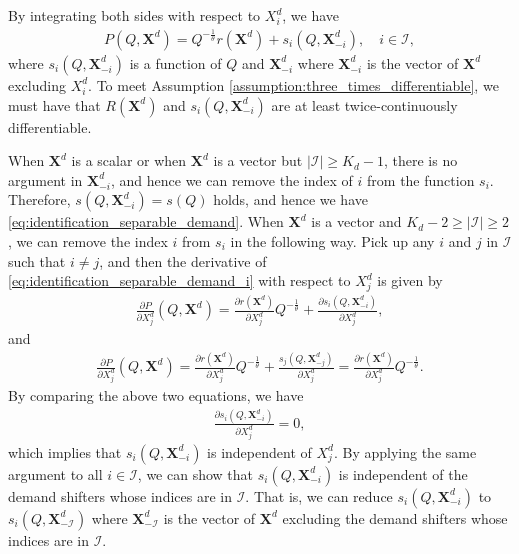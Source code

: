 \documentclass[11pt, a4paper]{article}
\begin{document}
By integrating both sides with respect to $X^{d}_i$, we have
\begin{align}
    P(Q, \bm{X}^{d}) = Q^{-\frac{1}{\theta}}r(\bm{X}^{d}) + s_i(Q, \bm{X}^{d}_{-i}), \quad i \in \mathcal{I}, \label{eq:identification_separable_demand_i}
\end{align}
where $s_i(Q, \bm{X}^{d}_{-i})$ is a function of $Q$ and $\bm{X}^{d}_{-i}$ where $\bm{X}^{d}_{-i}$ is the vector of $\bm{X}^{d}$ excluding $X^{d}_i$.
To meet Assumption \ref{assumption:three_times_differentiable}, we must have that $R(\bm{X}^{d})$ and $s_i(Q, \bm{X}^{d}_{-i})$ are at least twice-continuously differentiable.

When $\bm{X}^{d}$ is a scalar or when $\bm{X}^{d}$ is a vector but $|\mathcal{I}| \ge K_d-1$, there is no argument in $\bm{X}^{d}_{-i}$, and hence we can remove the index of $i$ from the function $s_i$.
Therefore, $s(Q, \bm{X}^{d}_{-i}) = s(Q)$ holds, and hence we have \eqref{eq:identification_separable_demand}.
When $\bm{X}^{d}$ is a vector and $K_d -2 \ge|\mathcal{I}|\ge 2$, we can remove the index $i$ from $s_i$ in the following way.
Pick up any $i$ and $j$ in $\mathcal{I}$ such that $i \ne j$, and then the derivative of \eqref{eq:identification_separable_demand_i} with respect to $X^{d}_j$ is given by
\begin{align}
    \frac{\partial P}{\partial X^{d}_j}(Q, \bm{X}^{d}) = \frac{\partial r(\bm{X}^{d})}{\partial X^{d}_j} Q^{-\frac{1}{\theta}} + \frac{\partial s_i(Q, \bm{X}^{d}_{-i})}{\partial X^{d}_j},
\end{align}
and
\begin{align}
    \frac{\partial P}{\partial X^{d}_j}(Q, \bm{X}^{d}) = \frac{\partial r(\bm{X}^{d})}{\partial X^{d}_j} Q^{-\frac{1}{\theta}} + \frac{s_j(Q, \bm{X}^{d}_{-j})}{\partial X^{d}_j} = \frac{\partial r(\bm{X}^{d})}{\partial X^{d}_j} Q^{-\frac{1}{\theta}}.
\end{align}
By comparing the above two equations, we have
\begin{align}
    \frac{\partial s_i(Q, \bm{X}^{d}_{-i})}{\partial X^{d}_j} = 0,
\end{align} 
which implies that $s_i(Q, \bm{X}^{d}_{-i})$ is independent of $X^{d}_j$.
By applying the same argument to all $i \in \mathcal{I}$, we can show that $s_i(Q, \bm{X}^{d}_{-i})$ is independent of the demand shifters whose indices are in $\mathcal{I}$.
That is, we can reduce $s_i(Q, \bm{X}^{d}_{-i})$ to $s_i(Q, \bm{X}^{d}_{-\mathcal{I}})$ where $\bm{X}^{d}_{-\mathcal{I}}$ is the vector of $\bm{X}^{d}$ excluding the demand shifters whose indices are in $\mathcal{I}$.
\end{document}

